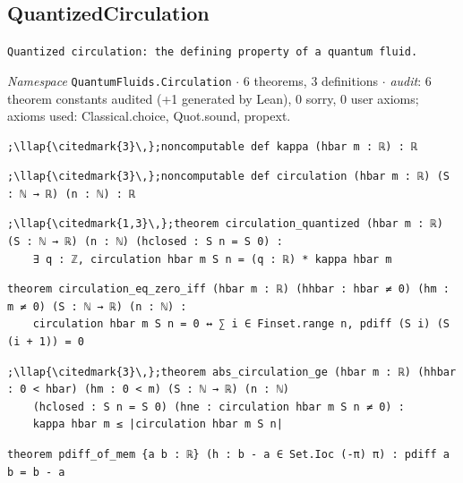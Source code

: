 \subsection{QuantizedCirculation}\label{appA:QuantizedCirculation}
{\footnotesize\raggedright\texttt{Quantized circulation: the defining property of a quantum fluid.\allowbreak{}}\par}
{\footnotesize\raggedright\emph{Namespace} \texttt{QuantumFluids.\allowbreak{}Circulation} $\cdot$ 6 theorems, 3 definitions $\cdot$ \emph{audit}: 6 theorem constants audited (+1 generated by Lean), 0 sorry, 0 user axioms; axioms used: Classical.choice, Quot.sound, propext.\par}
\vspace{1pt}
\begin{lstlisting}[style=leancat]
;\llap{\citedmark{3}\,};noncomputable def kappa (hbar m : ℝ) : ℝ
\end{lstlisting}

\begin{lstlisting}[style=leancat]
;\llap{\citedmark{3}\,};noncomputable def circulation (hbar m : ℝ) (S : ℕ → ℝ) (n : ℕ) : ℝ
\end{lstlisting}

\begin{lstlisting}[style=leancat]
;\llap{\citedmark{1,3}\,};theorem circulation_quantized (hbar m : ℝ) (S : ℕ → ℝ) (n : ℕ) (hclosed : S n = S 0) :
    ∃ q : ℤ, circulation hbar m S n = (q : ℝ) * kappa hbar m
\end{lstlisting}

\begin{lstlisting}[style=leancat]
theorem circulation_eq_zero_iff (hbar m : ℝ) (hhbar : hbar ≠ 0) (hm : m ≠ 0) (S : ℕ → ℝ) (n : ℕ) :
    circulation hbar m S n = 0 ↔ ∑ i ∈ Finset.range n, pdiff (S i) (S (i + 1)) = 0
\end{lstlisting}

\begin{lstlisting}[style=leancat]
;\llap{\citedmark{3}\,};theorem abs_circulation_ge (hbar m : ℝ) (hhbar : 0 < hbar) (hm : 0 < m) (S : ℕ → ℝ) (n : ℕ)
    (hclosed : S n = S 0) (hne : circulation hbar m S n ≠ 0) :
    kappa hbar m ≤ |circulation hbar m S n|
\end{lstlisting}

\begin{lstlisting}[style=leancat]
theorem pdiff_of_mem {a b : ℝ} (h : b - a ∈ Set.Ioc (-π) π) : pdiff a b = b - a
\end{lstlisting}

